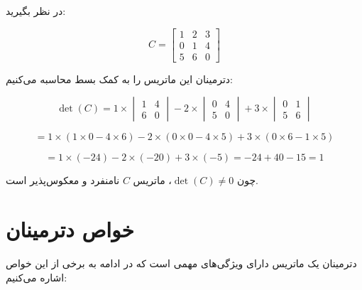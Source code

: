 \begin{example}
	در نظر بگیرید:
	
	\[
	C = \begin{bmatrix} 1 & 2 & 3 \\ 0 & 1 & 4 \\ 5 & 6 & 0 \end{bmatrix}
	\]
	
	دترمینان این ماتریس را به کمک بسط محاسبه می‌کنیم:
	
	\[
	\det(C) = 1 \times \begin{vmatrix} 1 & 4 \\ 6 & 0 \end{vmatrix}
	- 2 \times \begin{vmatrix} 0 & 4 \\ 5 & 0 \end{vmatrix}
	+ 3 \times \begin{vmatrix} 0 & 1 \\ 5 & 6 \end{vmatrix}
	\]
	
	\[
	= 1 \times (1 \times 0 - 4 \times 6)
	- 2 \times (0 \times 0 - 4 \times 5)
	+ 3 \times (0 \times 6 - 1 \times 5)
	\]
	
	\[
	= 1 \times (-24) - 2 \times (-20) + 3 \times (-5) = -24 + 40 - 15 = 1
	\]
	
	چون $\det(C) \neq 0$، ماتریس $C$ نامنفرد و معکوس‌پذیر است.
\end{example}
	
	\section{خواص دترمینان}
	دترمینان یک ماتریس دارای ویژگی‌های مهمی است که در ادامه به برخی از این خواص اشاره می‌کنیم:
	
